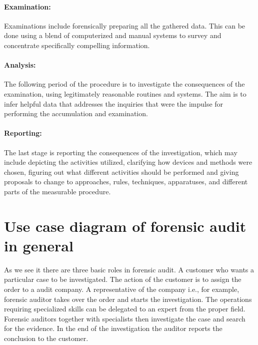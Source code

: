 \paragraph{Examination:}
Examinations include forensically preparing all the gathered data. This can be done using a blend of computerized and manual systems to survey and concentrate specifically compelling information. 

\paragraph{Analysis:}
The following period of the procedure is to investigate the consequences of the examination, using legitimately reasonable routines and systems. The aim is to infer helpful data that addresses the inquiries that were the impulse for performing the accumulation and examination. 


\paragraph{Reporting:}
The last stage is reporting the consequences of the investigation, which may include depicting the activities utilized, clarifying how devices and methods were chosen, figuring out what different activities should be performed and giving proposals to change to approaches, rules, techniques, apparatuses, and different parts of the measurable procedure. 







\section{Use case diagram of forensic audit in general}

As we see it there are three basic roles in forensic audit. A customer who wants a particular case to be investigated. The action of the customer is to assign the order to a audit company. A representative of the company i.e., for example, forensic auditor takes over the order and starts the investigation. The operations requiring specialized skills can be delegated to an expert from the proper field. Forensic auditors together with specialists then investigate the case and search for the evidence. In the end of the investigation the auditor reports the conclusion to the customer. 

